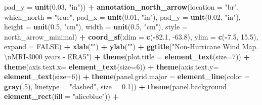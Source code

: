 \documentclass[12pt,oneside]{reedthesis}
\newenvironment{Shaded}{\begin{snugshade}}{\end{snugshade}}
\newcommand{\CharTok}[1]{\textcolor[rgb]{0.31,0.60,0.02}{#1}}
\newcommand{\DataTypeTok}[1]{\textcolor[rgb]{0.13,0.29,0.53}{#1}}
\newcommand{\DecValTok}[1]{\textcolor[rgb]{0.00,0.00,0.81}{#1}}
\newcommand{\FloatTok}[1]{\textcolor[rgb]{0.00,0.00,0.81}{#1}}
\newcommand{\KeywordTok}[1]{\textcolor[rgb]{0.13,0.29,0.53}{\textbf{#1}}}
\newcommand{\NormalTok}[1]{#1}
\newcommand{\OperatorTok}[1]{\textcolor[rgb]{0.81,0.36,0.00}{\textbf{#1}}}
\newcommand{\OtherTok}[1]{\textcolor[rgb]{0.56,0.35,0.01}{#1}}
\newcommand{\StringTok}[1]{\textcolor[rgb]{0.31,0.60,0.02}{#1}}
\begin{document}
\begin{Shaded}
\begin{Highlighting}[]
   \DataTypeTok{pad_y =} \KeywordTok{unit}\NormalTok{(}\FloatTok{0.03}\NormalTok{, }\StringTok{"in"}\NormalTok{)) }\OperatorTok{+}\StringTok{ }
\StringTok{  }\KeywordTok{annotation_north_arrow}\NormalTok{(}\DataTypeTok{location =} \StringTok{"br"}\NormalTok{, }\DataTypeTok{which_north =} \StringTok{"true"}\NormalTok{, }\DataTypeTok{pad_x =} \KeywordTok{unit}\NormalTok{(}\FloatTok{0.01}\NormalTok{, }\StringTok{"in"}\NormalTok{), }\DataTypeTok{pad_y =} \KeywordTok{unit}\NormalTok{(}\FloatTok{0.02}\NormalTok{, }\StringTok{"in"}\NormalTok{), }\DataTypeTok{height =} \KeywordTok{unit}\NormalTok{(}\FloatTok{0.5}\NormalTok{, }\StringTok{"cm"}\NormalTok{), }
   \DataTypeTok{width =} \KeywordTok{unit}\NormalTok{(}\FloatTok{0.5}\NormalTok{, }\StringTok{"cm"}\NormalTok{), }\DataTypeTok{style =}\NormalTok{ north_arrow_minimal) }\OperatorTok{+}
\StringTok{  }\KeywordTok{coord_sf}\NormalTok{(}\DataTypeTok{xlim =} \KeywordTok{c}\NormalTok{(}\OperatorTok{-}\FloatTok{82.1}\NormalTok{, }\FloatTok{-63.8}\NormalTok{), }\DataTypeTok{ylim =} \KeywordTok{c}\NormalTok{(}\OperatorTok{-}\FloatTok{7.5}\NormalTok{, }\FloatTok{15.5}\NormalTok{), }\DataTypeTok{expand =} \OtherTok{FALSE}\NormalTok{) }\OperatorTok{+}
\StringTok{  }\KeywordTok{xlab}\NormalTok{(}\StringTok{""}\NormalTok{) }\OperatorTok{+}\StringTok{ }
\StringTok{  }\KeywordTok{ylab}\NormalTok{(}\StringTok{""}\NormalTok{) }\OperatorTok{+}\StringTok{ }
\StringTok{  }\KeywordTok{ggtitle}\NormalTok{(}\StringTok{"Non-Hurricane Wind Map. }\CharTok{\textbackslash{}n}\StringTok{MRI-3000 years - ERA5"}\NormalTok{) }\OperatorTok{+}\StringTok{ }
\StringTok{  }\KeywordTok{theme}\NormalTok{(}\DataTypeTok{plot.title =} \KeywordTok{element_text}\NormalTok{(}\DataTypeTok{size=}\DecValTok{7}\NormalTok{)) }\OperatorTok{+}
\StringTok{  }\KeywordTok{theme}\NormalTok{(}\DataTypeTok{axis.text.x=} \KeywordTok{element_text}\NormalTok{(}\DataTypeTok{size=}\DecValTok{6}\NormalTok{)) }\OperatorTok{+}\StringTok{ }
\StringTok{  }\KeywordTok{theme}\NormalTok{(}\DataTypeTok{axis.text.y=} \KeywordTok{element_text}\NormalTok{(}\DataTypeTok{size=}\DecValTok{6}\NormalTok{)) }\OperatorTok{+}
\StringTok{  }\KeywordTok{theme}\NormalTok{(}\DataTypeTok{panel.grid.major =} \KeywordTok{element_line}\NormalTok{(}\DataTypeTok{color =} \KeywordTok{gray}\NormalTok{(.}\DecValTok{5}\NormalTok{), }\DataTypeTok{linetype =} \StringTok{"dashed"}\NormalTok{, }\DataTypeTok{size =} \FloatTok{0.1}\NormalTok{)) }\OperatorTok{+}
\StringTok{  }\KeywordTok{theme}\NormalTok{(}\DataTypeTok{panel.background =} \KeywordTok{element_rect}\NormalTok{(}\DataTypeTok{fill =} \StringTok{"aliceblue"}\NormalTok{)) }\OperatorTok{+}

\end{Highlighting}
\end{Shaded}
\end{document}
